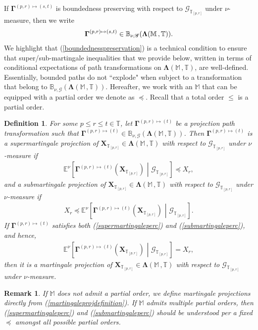 \documentclass[12pt,a4paper]{article}
\newtheorem{defn}[thm]{Definition}
\newtheorem{rem}[thm]{Remark}
\def\M{\mathbb{M}}
\def\T{\mathbb{T}}
\def\G{\mathscr{G}}
\begin{document}
%
If $\boldsymbol{\Gamma}^{(p,r)\mapsto(s,t)}$ is boundedness preserving with respect to $\G_{\T_{[p,r]}}$ under $\nu$-measure, then we write 
\begin{align}
\boldsymbol{\Gamma}^{(p,r)\mapsto(s,t)} \in \mathbb{B}_{\nu,\G}(\boldsymbol{\Lambda}(\M \,, \T)). \notag 
\end{align}
We highlight that (\ref{boundednesspreservation}) is a technical condition to ensure that super/sub-martingale inequalities that we provide below, written in terms of conditional expectations of path transformations on $\boldsymbol{\Lambda}(\M \,, \T)$, are well-defined. Essentially, bounded paths do not ``explode" when subject to a transformation that belong to $\mathbb{B}_{\nu,\G}(\boldsymbol{\Lambda}(\M \,, \T))$. Hereafter, we work with an $\M$ that can be equipped with a partial order we denote as $\preceq$. Recall that a total order $\leq$ is a partial order.
%
\begin{defn}
\label{martingaletransformationdefinitionmain} {\em
For some $p\leq r \leq t \in \T$, let $\boldsymbol{\Gamma}^{(p,r)\mapsto(t)}$ be a projection path transformation such that $\boldsymbol{\Gamma}^{(p,r)\mapsto(t)} \in \mathbb{B}_{\nu,\G}(\boldsymbol{\Lambda}(\M \,, \T))$. Then $\boldsymbol{\Gamma}^{(p,r)\mapsto(t)}$ is a \emph{supermartingale projection} of $\boldsymbol{X}_{\T_{[p,r]}} \in \boldsymbol{\Lambda}(\M \,, \T)$ with respect to $\G_{\T_{[p,r]}}$ under $\nu$-measure if
\begin{align}
\mathbb{E}^{\nu}\left[\boldsymbol{\Gamma}^{(p,r)\mapsto(t)}\left(  \boldsymbol{X}_{\T_{[p,r]}} \right)  \,\, \left| \,\, \G_{\T_{[p,r]}} \right.\right] \preceq X_{r} \label{supermartingaleperc},
\end{align}
and a \emph{submartingale projection} of $\boldsymbol{X}_{\T_{[p,r]}} \in \boldsymbol{\Lambda}(\M \,, \T)$ with respect to $\G_{\T_{[p,r]}}$ under $\nu$-measure if
\begin{align}
X_{r} \preceq \mathbb{E}^{\nu}\left[\boldsymbol{\Gamma}^{(p,r)\mapsto(t)}\left(  \boldsymbol{X}_{\T_{[p,r]}} \right)  \,\, \left| \,\, \G_{\T_{[p,r]}} \right.\right] \label{submartingaleperc}.
\end{align}
If $\boldsymbol{\Gamma}^{(p,r)\mapsto(t)}$ satisfies both {\rm(\ref{supermartingaleperc})} and {\rm (\ref{submartingaleperc})}, and hence,
\begin{align}
\label{martingaleprojdefinition}
\mathbb{E}^{\nu}\left[\boldsymbol{\Gamma}^{(p,r)\mapsto(t)}\left(  \boldsymbol{X}_{\T_{[p,r]}} \right)  \,\, \left| \,\, \G_{\T_{[p,r]}} \right.\right] = X_{r},
\end{align}
then it is a \emph{martingale projection} of $\boldsymbol{X}_{\T_{[p,r]}} \in \boldsymbol{\Lambda}(\mathbb M \,, \T)$ with respect to $\G_{\T_{[p,r]}}$ under $\nu$-measure.}
\end{defn}
%
\begin{rem}{\em
If $\M$ does not admit a partial order, we define martingale projections directly from (\ref{martingaleprojdefinition}). If $\M$ admits multiple partial orders, then (\ref{supermartingaleperc}) and (\ref{submartingaleperc}) should be understood per a fixed $\preceq$ amongst all possible partial orders.}
\end{rem}
\end{document}
